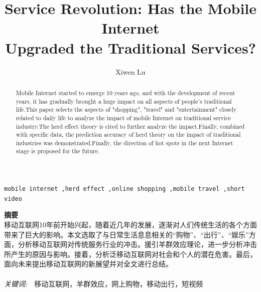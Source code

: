 \documentclass{elsarticle}
\begin{document}
	
\begin{frontmatter}

\title{\textbf{Service Revolution: Has the Mobile Internet\\Upgraded the Traditional Services?}}


\author{Xiwen Lu}%
\address{School of Computer Science and Technology, China University of Mining and Technology}



\begin{abstract}
Mobile Internet started to emerge 10 years ago, and with the development of recent years, it has gradually brought a huge impact on all aspects of people's traditional life.This paper selects the aspects of "shopping", "travel" and "entertainment" closely related to daily life to analyze the impact of mobile Internet on traditional service industry.The herd effect theory is cited to further analyze the impact.Finally, combined with specific data, the prediction accuracy of herd theory on the impact of traditional industries was demonstrated.Finally, the direction of hot spots in the next Internet stage is proposed for the future. 
\end{abstract}


\begin{keyword}
\texttt{mobile internet \sep herd effect \sep online shopping \sep mobile travel \sep short video}
\end{keyword}
\end{frontmatter}


\noindent\textbf{摘要}\\
\indent 移动互联网10年前开始兴起，随着近几年的发展，逐渐对人们传统生活的各个方面带来了巨大的影响。本文选取了与日常生活息息相关的“购物”、“出行”、“娱乐”方面，分析移动互联网对传统服务行业的冲击。援引羊群效应理论，进一步分析冲击所产生的原因与影响。接着，分析泛移动互联网对社会和个人的潜在危害。最后，面向未来提出移动互联网的新展望并对全文进行总结。\\
\\
\textsl{关键词:}\ \ 移动互联网，羊群效应，网上购物，移动出行，短视频
\end{document}
